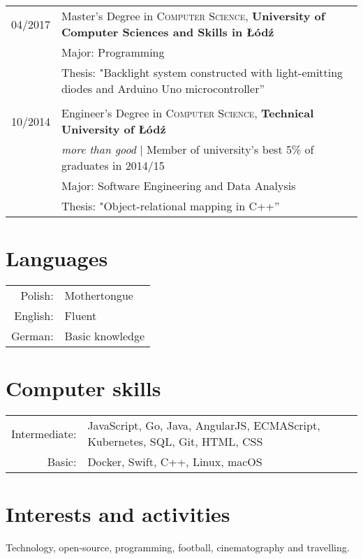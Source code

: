 \documentclass[a4paper,10pt]{article}
\begin{document}
\begin{tabular}{rl}	
04/2017 & Master's Degree in \textsc{Computer Science}, \textbf{University of Computer Sciences and Skills in Łódź} \\
& \small  Major: Programming\\
& \small Thesis: "Backlight system constructed with light-emitting diodes and Arduino Uno microcontroller'' \\&\\

10/2014 & Engineer's Degree in \textsc{Computer Science}, \textbf{Technical University of Łódź} \\
& \small\emph{more than good} | Member of university’s best 5\% of graduates in 2014/15\\
& \small  Major: Software Engineering and Data Analysis \\
& \small Thesis: "Object-relational mapping in C++'' \\
\end{tabular}

\section{Languages}

\begin{tabular}{rl}
	Polish: & Mothertongue\\
	English: & Fluent\\
	German: & Basic knowledge\\
\end{tabular}

\section{Computer skills}
\begin{tabular}{rl}
	Intermediate: & JavaScript, Go, Java, AngularJS, ECMAScript, Kubernetes, SQL, Git, HTML, CSS \\
	Basic: & Docker, Swift, C++, Linux, macOS \\
\end{tabular}

\section{Interests and activities}
Technology, open-source, programming, football, cinematography and travelling.
\end{document}
